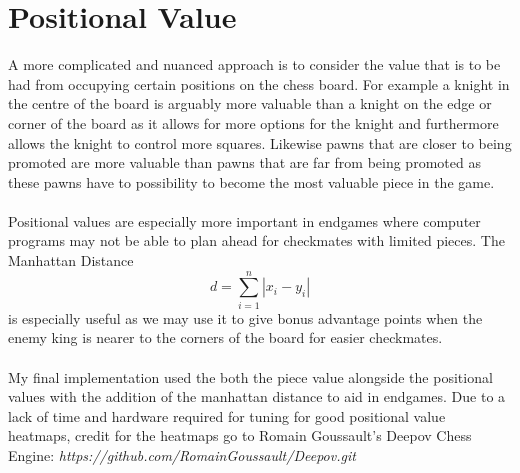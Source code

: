 \section{Positional Value}
A more complicated and nuanced approach is to consider the value that is to be had from occupying certain positions on the chess board. For example a knight in the centre of the board is arguably more valuable than a knight on the edge or corner of the board as it allows for more options for the knight and furthermore allows the knight to control more squares. Likewise pawns that are closer to being promoted are more valuable than pawns that are far from being promoted as these pawns have to possibility to become the most valuable piece in the game.\\\\
Positional values are especially more important in endgames where computer programs may not be able to plan ahead for checkmates with limited pieces. The Manhattan Distance \[d = \sum_{i = 1}^{n}|x_i - y_i|\]is especially useful as we may use it to give bonus advantage points when the enemy king is nearer to the corners of the board for easier checkmates.\\\\
My final implementation used the both the piece value alongside the positional values with the addition of the manhattan distance to aid in endgames. Due to a lack of time and hardware required for tuning for good positional value heatmaps, credit for the heatmaps go to Romain Goussault's Deepov Chess Engine: \textit{https://github.com/RomainGoussault/Deepov.git}